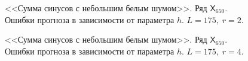 \documentclass[specialist,
               substylefile = spbu.rtx,
               subf,href,colorlinks=true, 12p]{disser}
\begin{document}
\begin{figure}[H]
	\captionsetup{justification=centering}
	\caption{<<Сумма синусов с небольшим белым шумом>>. Ряд $\mathsf{X}_{650}$. Ошибки прогноза в зависимости от параметра $h$. $L = 175, \; r = 2$.}
	\label{edsin0.3r_r2.h}
\end{figure}

\begin{figure}[H]
	\captionsetup{justification=centering}
	\caption{<<Сумма синусов с небольшим белым шумом>>. Ряд $\mathsf{X}_{650}$. Ошибки прогноза в зависимости от параметра $h$. $L = 175, \; r = 4$.}
	\label{edsin0.3r_r4.h}
\end{figure}
\end{document}
